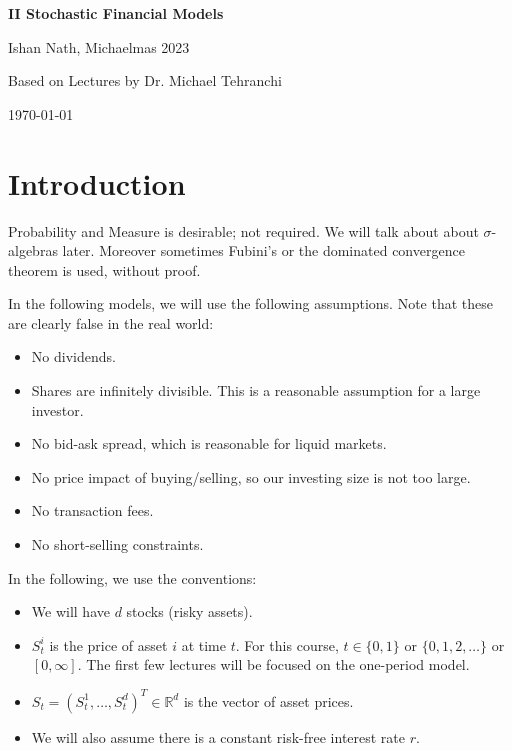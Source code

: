 \documentclass[12pt]{article}
\begin{document}
\hypersetup{pageanchor=false}
\begin{titlepage}
	\begin{center}
		\vspace*{1em}
		\Huge
		\textbf{II Stochastic Financial Models}

		\vspace{1em}
		\large
		Ishan Nath, Michaelmas 2023

		\vspace{1.5em}

		\Large

		Based on Lectures by Dr. Michael Tehranchi

		\vspace{1em}

		\large
		\today
	\end{center}
	
\end{titlepage}
\hypersetup{pageanchor=true}

\tableofcontents

\newpage

\section{Introduction}
\label{sec:intro}

Probability and Measure is desirable; not required. We will talk about about $\sigma$-algebras later. Moreover sometimes Fubini's or the dominated convergence theorem is used, without proof.

In the following models, we will use the following assumptions. Note that these are clearly false in the real world:

\begin{itemize}
	\item No dividends.
	\item  Shares are infinitely divisible. This is a reasonable assumption for a large investor.
	\item No bid-ask spread, which is reasonable for liquid markets.
	\item No price impact of buying/selling, so our investing size is not too large.
	\item No transaction fees.
	\item No short-selling constraints.
\end{itemize}

In the following, we use the conventions:
\begin{itemize}
	\item We will have $d$ stocks (risky assets).
	\item $S^i_t$ is the price of asset $i$ at time $t$. For this course, $t \in \{0, 1\}$ or $\{0, 1, 2, \ldots\}$ or $[0,\infty]$. The first few lectures will be focused on the one-period model.
	\item $S_t = (S^1_t, \ldots, S^d_t)^T \in \mathbb{R}^d$ is the vector of asset prices.
	\item We will also assume there is a constant risk-free interest rate $r$.
\end{itemize}
\end{document}
